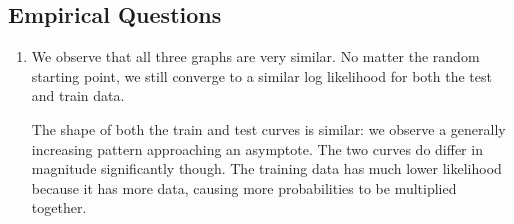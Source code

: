 \documentclass[12pt, letterpaper]{article}
\begin{document}
\subsection{Empirical Questions}
\begin{enumerate}[1.]
    \item 
        We observe that all three graphs are very similar. No matter the random starting point, we still converge to a similar log likelihood for both the test and train data. 

        The shape of both the train and test curves is similar: we observe a generally increasing pattern approaching an asymptote. The two curves do differ in magnitude significantly though. The training data has much lower likelihood because it has more data, causing more probabilities to be multiplied together.


\end{enumerate}
\end{document}
